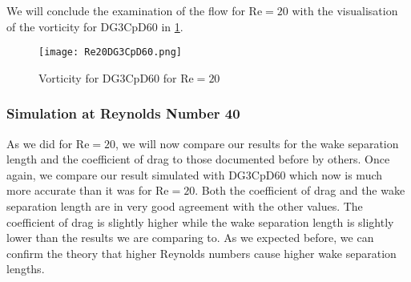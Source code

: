 We will conclude the examination of the flow for $\text{Re} = 20$ with the visualisation of the vorticity for DG3CpD60  in \cref{fig:vorticity20}.
	
\begin{figure}[htp]
	\centering
	\texttt{[image: Re20DG3CpD60.png]}
	\caption{Vorticity for DG3CpD60 for $\text{Re} = 20$}
	\label{fig:vorticity20}
\end{figure}	
\newpage
	\subsubsection{Simulation at Reynolds Number 40}
	As we did for $\text{Re}=20$, we will now compare our results for the wake separation length and the coefficient of drag to those documented before by others. Once again, we compare our result simulated with DG3CpD60 which now is much more accurate than it was for $\text{Re}=20$. Both the coefficient of drag and the wake separation length are in very good agreement with the other values. The coefficient of drag is slightly higher while the wake separation length is slightly lower than the results we are comparing to. As we expected before, we can confirm the theory that higher Reynolds numbers cause higher wake separation lengths.

